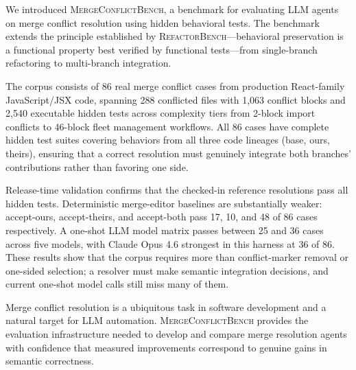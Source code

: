\documentclass[11pt,letterpaper]{article}
\begin{document}
We introduced \textsc{MergeConflictBench}, a benchmark for evaluating LLM agents on merge conflict resolution using hidden behavioral tests. The benchmark extends the principle established by \textsc{RefactorBench}---behavioral preservation is a functional property best verified by functional tests---from single-branch refactoring to multi-branch integration.

The corpus consists of 86 real merge conflict cases from production React-family JavaScript/JSX code, spanning 288 conflicted files with 1{,}063 conflict blocks and 2{,}540 executable hidden tests across complexity tiers from 2-block import conflicts to 46-block fleet management workflows. All 86 cases have complete hidden test suites covering behaviors from all three code lineages (base, ours, theirs), ensuring that a correct resolution must genuinely integrate both branches' contributions rather than favoring one side.

Release-time validation confirms that the checked-in reference resolutions pass all hidden tests. Deterministic merge-editor baselines are substantially weaker: accept-ours, accept-theirs, and accept-both pass 17, 10, and 48 of 86 cases respectively. A one-shot LLM model matrix passes between 25 and 36 cases across five models, with Claude Opus 4.6 strongest in this harness at 36 of 86. These results show that the corpus requires more than conflict-marker removal or one-sided selection; a resolver must make semantic integration decisions, and current one-shot model calls still miss many of them.

Merge conflict resolution is a ubiquitous task in software development and a natural target for LLM automation. \textsc{MergeConflictBench} provides the evaluation infrastructure needed to develop and compare merge resolution agents with confidence that measured improvements correspond to genuine gains in semantic correctness.



\end{document}
